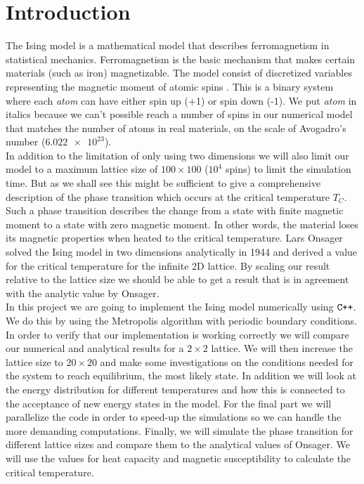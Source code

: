 \documentclass[%
 reprint,
nofootinbib,
aps,
]{revtex4-1}
\begin{document}
\section{Introduction}
The Ising model is a mathematical model that describes ferromagnetism in statistical mechanics. Ferromagnetism is the basic mechanism that makes certain materials (such as iron) magnetizable. The model consist of discretized variables representing the magnetic moment of atomic spins \cite{wiki:Ising}. This is a binary system where each \textit{atom} can have either spin up (+1) or spin down (-1). We put \textit{atom} in italics because we can't possible reach a number of spins in our numerical model that matches the number of atoms in real materials, on the scale of Avogadro's number ($\num{6.022e23}$).\\
In addition to the limitation of only using two dimensions we will also limit our model to a maximum lattice size of $100\times100$ ($10^4$ spins) to limit the simulation time. But as we shall see this might be sufficient to give a comprehensive description of the phase transition which occurs at the critical temperature $T_C$. Such a phase transition describes the change from a state with finite magnetic moment to a state with zero magnetic moment. In other words, the material loses its magnetic properties when heated to the critical temperature. Lars Onsager solved the Ising model in two dimensions analytically in 1944\cite{Onsager} and derived a value for the critical temperature for the infinite 2D lattice. By scaling our result relative to the lattice size we should be able to get a result that is in agreement with the analytic value by Onsager. \\
In this project we are going to implement the Ising model numerically using $\verb!C++!$. We do this by using the Metropolis algorithm with periodic boundary conditions. In order to verify that our implementation is working correctly we will compare our numerical and analytical results for a $2\times 2$ lattice. We will then increase the lattice size to $20\times20$ and make some investigations on the conditions needed for the system to reach equilibrium, the most likely state. In addition we will look at the energy distribution for different temperatures and how this is connected to the acceptance of new energy states in the model. For the final part we will parallelize the code in order to speed-up the simulations so we can handle the more demanding computations. Finally, we will simulate the phase transition for different lattice sizes and compare them to the analytical values of Onsager. We will use the values for heat capacity and magnetic susceptibility to calculate the critical temperature.
\end{document}
